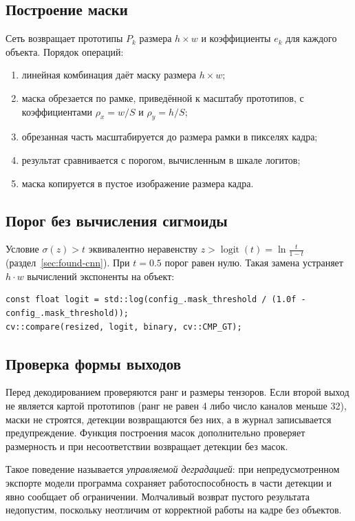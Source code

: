 \documentclass[11pt,a4paper]{article}
\theoremstyle{definition}
\theoremstyle{remark}
\begin{document}
\subsection{Построение маски}

Сеть возвращает прототипы $P_k$ размера $h \times w$ и коэффициенты $e_k$
для каждого объекта. Порядок операций:

\begin{enumerate}
  \item линейная комбинация даёт маску размера $h \times w$;
  \item маска обрезается по рамке, приведённой к масштабу прототипов, с
        коэффициентами $\rho_x = w/S$ и $\rho_y = h/S$;
  \item обрезанная часть масштабируется до размера рамки в пикселях кадра;
  \item результат сравнивается с порогом, вычисленным в шкале логитов;
  \item маска копируется в пустое изображение размера кадра.
\end{enumerate}

\subsection{Порог без вычисления сигмоиды}

Условие $\sigma(z) > t$ эквивалентно неравенству $z > \operatorname{logit}(t)
= \ln\frac{t}{1-t}$ (раздел~\ref{sec:found-cnn}). При $t = 0.5$ порог равен
нулю. Такая замена устраняет $h \cdot w$ вычислений экспоненты на объект:

\begin{lstlisting}
const float logit = std::log(config_.mask_threshold / (1.0f - config_.mask_threshold));
cv::compare(resized, logit, binary, cv::CMP_GT);
\end{lstlisting}

\subsection{Проверка формы выходов}

Перед декодированием проверяются ранг и размеры тензоров. Если второй выход
не является картой прототипов (ранг не равен 4 либо число каналов меньше 32),
маски не строятся, детекции возвращаются без них, а в журнал записывается
предупреждение. Функция построения масок дополнительно проверяет размерность
и при несоответствии возвращает детекции без масок.

Такое поведение называется \emph{управляемой деградацией}: при
непредусмотренном экспорте модели программа сохраняет работоспособность в
части детекции и явно сообщает об ограничении. Молчаливый возврат пустого
результата недопустим, поскольку неотличим от корректной работы на кадре без
объектов.
\end{document}
